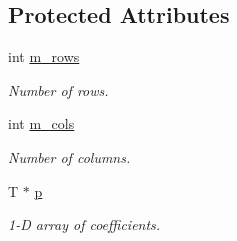 \subsection*{Protected Attributes}
\begin{DoxyCompactItemize}
\item 
int \hyperlink{classlibNumerics_1_1matrix_a385a7057ca792f9bad1ab7b9d1076ea9}{m\+\_\+rows}
\begin{DoxyCompactList}\small\item\em Number of rows. \end{DoxyCompactList}\item 
int \hyperlink{classlibNumerics_1_1matrix_aee316845e7da8c2a06001e4ba5005f6f}{m\+\_\+cols}
\begin{DoxyCompactList}\small\item\em Number of columns. \end{DoxyCompactList}\item 
T $\ast$ \hyperlink{classlibNumerics_1_1matrix_a2129a3166fc1209becd143b13225e3c4}{p}
\begin{DoxyCompactList}\small\item\em 1-\/\+D array of coefficients. \end{DoxyCompactList}\end{DoxyCompactItemize}
